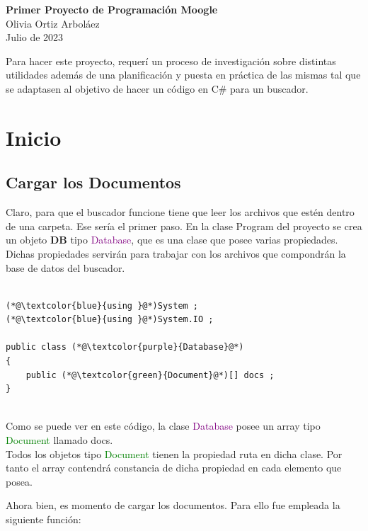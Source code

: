\documentclass{article}
\begin{document}
\lstset{style=myCsharpstyle}
\begin{center}
\Huge\textbf{Primer Proyecto de Programación Moogle}\\
\vspace{0.5em}
\large Olivia Ortiz Arboláez \\
\tiny Julio de 2023
\end{center}

Para hacer este proyecto, requerí un proceso de investigación sobre distintas utilidades además de una planificación 
y puesta en práctica de las mismas tal que se adaptasen al objetivo de hacer un código en C\# para un buscador.



\section{Inicio} 

\subsection{Cargar los Documentos}
Claro, para que el buscador funcione tiene que leer los archivos que estén dentro de una carpeta. Ese sería el primer paso.
En la clase Program del proyecto se crea un objeto \textbf{DB} tipo \textcolor{purple}{Database}, que es una clase que posee varias propiedades. Dichas propiedades servirán para trabajar con los archivos
que compondrán la base de datos del buscador.

\begin{lstlisting}
    
(*@\textcolor{blue}{using }@*)System ;
(*@\textcolor{blue}{using }@*)System.IO ;

public class (*@\textcolor{purple}{Database}@*)
{
    public (*@\textcolor{green}{Document}@*)[] docs ;
}


\end{lstlisting}

Como se puede ver en este código, la clase \textcolor{purple}{Database} posee un array tipo \textcolor{green}{Document} llamado docs.\\
\setlength Todos los objetos tipo \textcolor{green}{Document} tienen la propiedad ruta en dicha clase. Por tanto el array contendrá constancia de dicha propiedad en cada elemento que posea.

Ahora bien, es momento de cargar los documentos. Para ello fue empleada la siguiente función:
\end{document}
